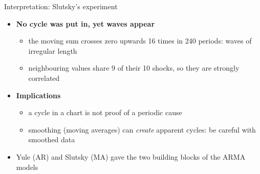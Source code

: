 \begin{frame}{Interpretation: Slutsky's experiment}
\itemsize{\small}
\begin{itemize}
    \item \textbf{No cycle was put in, yet waves appear}
    \begin{itemize}
        \item the moving sum crosses zero upwards 16 times in 240 periods: waves of irregular length
        \item neighbouring values share 9 of their 10 shocks, so they are strongly correlated
    \end{itemize}
    \item \textbf{Implications}
    \begin{itemize}
        \item a cycle in a chart is not proof of a periodic cause
        \item smoothing (moving averages) can \emph{create} apparent cycles: be careful with smoothed data
    \end{itemize}
    \item Yule (AR) and Slutsky (MA) gave the two building blocks of the ARMA models
\end{itemize}
\end{frame}

